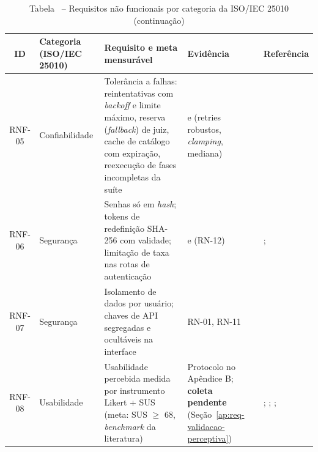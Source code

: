 \begin{table}[H]
\centering
\setlength{\tabcolsep}{2.5pt}
\caption*{Tabela \thetable\ -- Requisitos não funcionais por categoria da ISO/IEC 25010 (continuação)}
\begin{tabularx}{\textwidth}{|C|L{2.3cm}|Y|Y|L{3.3cm}|}
\hline
\textbf{ID} & \textbf{Categoria (ISO/IEC 25010)} & \textbf{Requisito e meta mensurável} & \textbf{Evidência} & \textbf{Referência} \\
\hline
RNF-05 & Confiabi\-lidade & Tolerância a falhas: reintentativas com \emph{backoff} e limite máximo, reserva (\emph{fallback}) de juiz, cache de catálogo com expiração, reexecução de fases incompletas da suíte &  e  (retries robustos, \emph{clamping}, mediana) & \cite{iso_25010} \\
\hline
RNF-06 & Segurança & Senhas só em \emph{hash}; tokens de redefinição SHA-256 com validade; limitação de taxa nas rotas de autenticação &  e  (RN-12) & \cite{owasp_asvs_2021}; \cite{iso_25010} \\
\hline
RNF-07 & Segurança & Isolamento de dados por usuário; chaves de API segregadas e ocultáveis na interface & RN-01, RN-11 & \cite{iso_25010} \\
\hline
RNF-08 & Usabilidade & Usabilidade percebida medida por instrumento Likert + SUS (meta: SUS $\geq$ 68, \emph{benchmark} da literatura) & Protocolo no Apêndice B; \textbf{coleta pendente} (Seção~\ref{ap:req-validacao-perceptiva}) & \cite{brooke_1996}; \cite{davis_1989}; \cite{hyzy_2022_sus_benchmark}; \cite{djamaluddin_2024_sus_online_learning} \\
\hline
\end{tabularx}
\end{table}

